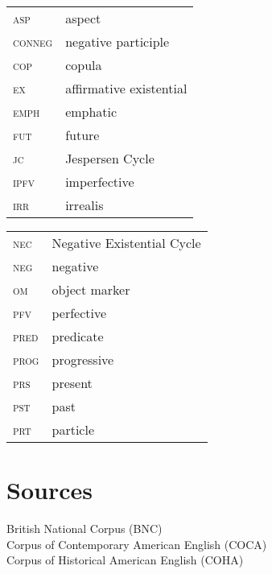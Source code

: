 \documentclass[output=paper,draft,draftmode,colorlinks,citecolor=brown]{langscibook}
\begin{document}
\begin{tabularx}{.5\textwidth}{@{}l l}
\textsc{asp}    &aspect\\
\textsc{conneg} &negative participle\\ 
\textsc{cop}    &copula\\
\textsc{ex}     &affirmative existential\\
\textsc{emph}    &emphatic\\
\textsc{fut}    &future\\
\textsc{jc}     &Jespersen Cycle\\ 
\textsc{ipfv}    &imperfective\\
\textsc{irr}    &irrealis\\
\end{tabularx}\begin{tabularx}{.5\textwidth}{l l@{}}
\textsc{nec}    &Negative Existential Cycle\\ 
\textsc{neg}    &negative\\ 
\textsc{om}    &object marker\\
\textsc{pfv}   &perfective\\
\textsc{pred}   &predicate\\
\textsc{prog}   &progressive\\
\textsc{prs}   &present\\
\textsc{pst}   &past\\
\textsc{prt}    &particle\\
\end{tabularx}


\section*{Sources}

British National Corpus (BNC)\\
Corpus of Contemporary American English (COCA)\\
Corpus of Historical American English (COHA)\\

{\sloppy\printbibliography[heading=subbibliography]}
\end{document}
